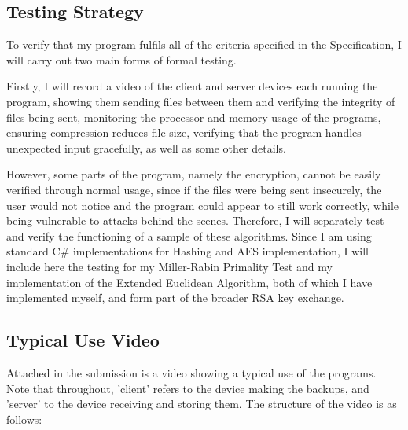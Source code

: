 \documentclass[../main.tex]{subfiles}
\begin{document}
\subsection{Testing Strategy}

To verify that my program fulfils all of the criteria specified in the Specification, I will carry out two main forms of formal testing.

Firstly, I will record a video of the client and server devices each running the program, showing them sending files between them and verifying the integrity of files being sent, monitoring the processor and memory usage of the programs, ensuring compression reduces file size, verifying that the program handles unexpected input gracefully, as well as some other details.

However, some parts of the program, namely the encryption, cannot be easily verified through normal usage, since if the files were being sent insecurely, the user would not notice and the program could appear to still work correctly, while being vulnerable to attacks behind the scenes. Therefore, I will separately test and verify the functioning of a sample of these algorithms. Since I am using standard C\# implementations for Hashing and AES implementation, I will include here the testing for my Miller-Rabin Primality Test and my implementation of the Extended Euclidean Algorithm, both of which I have implemented myself, and form part of the broader RSA key exchange.

\subsection{Typical Use Video}

Attached in the submission is a video showing a typical use of the programs. Note that throughout, 'client' refers to the device making the backups, and 'server' to the device receiving and storing them. The structure of the video is as follows:
\end{document}
